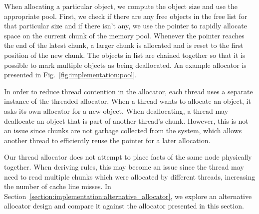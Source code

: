 When allocating a particular object, we compute the object size and use the
appropriate pool. First, we check if there are any free objects in the free list
for that particular size and if there isn't any, we use the  pointer
to rapidly allocate space on the current chunk of the memory pool.  Whenever the
 pointer reaches the end of the latest chunk, a larger chunk is
allocated and  is reset to the first position of the new chunk. The
objects in  list are chained together so that it is possible to mark
multiple objects as being deallocated.  An example allocator is presented in
Fig.~\ref{fig:implementation:pool}.


In order to reduce thread contention in the allocator, each thread uses a
separate instance of the threaded allocator. When a thread wants to allocate an
object, it asks its own allocator for a new object. When deallocating, a thread
may deallocate an object that is part of another thread's chunk. However, this is
not an issue since chunks are not garbage collected from the system, which
allows another thread to efficiently reuse the pointer for a later allocation.

Our thread allocator does not attempt to place facts of the same node physically
together. When deriving rules, this may become an issue since the thread may
need to read multiple chunks which were allocated by different threads,
increasing the number of cache line misses. In
Section~\ref{section:implementation:alternative_allocator}, we explore an
alternative allocator design and compare it against the allocator presented in
this section.
